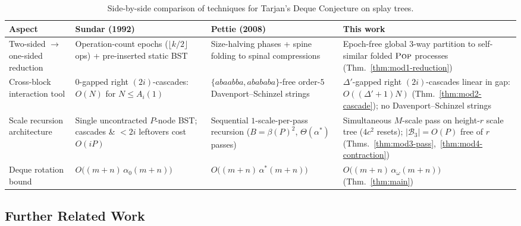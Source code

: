 \documentclass[11pt]{article}
\theoremstyle{definition}
\theoremstyle{remark}
\newcommand{\POP}{\textnormal{\scshape Pop}}
\begin{document}
\begin{table}[ht]
\centering
\footnotesize
\begin{tabular}{@{}p{}p{}p{}p{}@{}}
\toprule
\textbf{Aspect} & \textbf{Sundar (1992)~\cite{Sundar1992}} & \textbf{Pettie (2008)~\cite{Pettie2008}} & \textbf{This work} \tabularnewline
\midrule
\raggedright Two-sided $\to$ one-sided reduction & \raggedright Operation-count epochs ($\lfloor k/2 \rfloor$ ops) + pre-inserted static BST~\cite[\S3]{Sundar1992} & \raggedright Size-halving phases + spine folding to spinal compressions~\cite[\S2]{Pettie2008} & \raggedright Epoch-free global $3$-way partition to self-similar folded $\POP$ processes (Thm.~\ref{thm:mod1-reduction}) \tabularnewline
\addlinespace[3pt]
\raggedright Cross-block interaction tool & \raggedright $0$-gapped right $(2i)$-cascades: $O(N)$ for $N \le A_i(1)$~\cite[Thm.~3]{Sundar1992} & \raggedright $\{a b a a b b a, a b a b a b a\}$-free order-$5$ Davenport--Schinzel strings~\cite[\S4]{Pettie2008} & \raggedright $\Delta'$-gapped right $(2i)$-cascades linear in gap: $O((\Delta'+1)N)$ (Thm.~\ref{thm:mod2-cascade}); no Davenport--Schinzel strings \tabularnewline
\addlinespace[3pt]
\raggedright Scale recursion architecture & \raggedright Single uncontracted $P$-node BST; cascades \& $< 2i$ leftovers cost $O(i P)$ & \raggedright Sequential $1$-scale-per-pass recursion ($B = \beta(P)^2$, $\Theta(\alpha^*)$ passes) & \raggedright Simultaneous $M$-scale pass on height-$r$ scale tree ($4c^2$ resets); $|\mathcal{B}_3| = O(P)$ free of $r$ (Thms.~\ref{thm:mod3-pass},~\ref{thm:mod4-contraction}) \tabularnewline
\addlinespace[3pt]
\raggedright Deque rotation bound & \raggedright $O\big((m + n)\,\alpha_0(m + n)\big)$ & \raggedright $O\big((m + n)\,\alpha^*(m + n)\big)$ & \raggedright $O\big((m + n)\,\alpha_\omega(m + n)\big)$ (Thm.~\ref{thm:main}) \tabularnewline
\bottomrule
\end{tabular}
\caption{Side-by-side comparison of techniques for Tarjan's Deque Conjecture on splay trees.}
\label{tab:comparison}
\end{table}


\subsection{Further Related Work}
\end{document}
